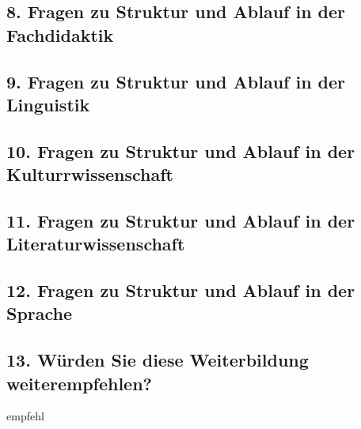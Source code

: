 \documentclass[a4paper,10pt]{article}
\makeatletter
\def\saveenum{\xdef\@savedenum{\the\c@enumi\relax}}
\makeatother
\begin{document}
{\begin{enumerate}
\end{enumerate} \saveenum

\vspace{-1cm}


\pagebreak


\subsection*{8. Fragen zu Struktur und Ablauf in der Fachdidaktik}



\pagebreak


\subsection*{9. Fragen zu Struktur und Ablauf in der Linguistik}



\pagebreak


\subsection*{10. Fragen zu Struktur und Ablauf in der Kulturrwissenschaft}



\pagebreak


\subsection*{11. Fragen zu Struktur und Ablauf in der Literaturwissenschaft}



\pagebreak


\subsection*{12. Fragen zu Struktur und Ablauf in der Sprache}



\pagebreak


\subsection*{13. Würden Sie diese Weiterbildung weiterempfehlen?}
\vspace{0.5cm}
\begin{questionmult}{empfehl}
	\begin{choiceshoriz}
	\end{choiceshoriz}
\end{questionmult}


}
\end{document}
